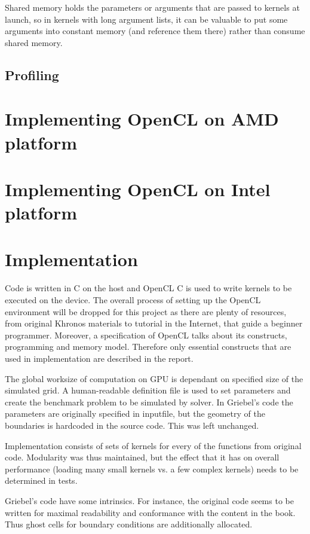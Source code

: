Shared memory holds the parameters or arguments that are passed to kernels at launch, so in kernels with long argument lists, it can be valuable to put some arguments into constant memory (and reference them there) rather than consume shared memory.

\subsection{Profiling}

\section{Implementing OpenCL on AMD platform}

\section{Implementing OpenCL on Intel platform}

\section{Implementation}
Code is written in C on the host and OpenCL C is used to write kernels to be executed on the device. The overall process of setting up the OpenCL environment will be dropped for this project as there are plenty of resources, from original Khronos materials to tutorial in the Internet, that guide a beginner programmer. Moreover, a specification of OpenCL talks about its constructs, programming and memory model. Therefore only essential constructs that are used in implementation are described in the report. 

The global worksize of computation on GPU is dependant on specified size of the simulated grid. A human-readable definition file is used to set parameters and create the benchmark problem to be simulated by solver. In Griebel's code the parameters are originally specified in inputfile, but the geometry of the boundaries is hardcoded in the source code. This was left unchanged.

Implementation consists of sets of kernels for every of the functions from original code. Modularity was thus maintained, but the effect that it has on overall performance (loading many small kernels vs. a few complex kernels) needs to be determined in tests.

Griebel's code have some intrinsics. For instance, the original code seems to be written for maximal readability and conformance with the content in the book. Thus ghost cells for boundary conditions are additionally allocated.

